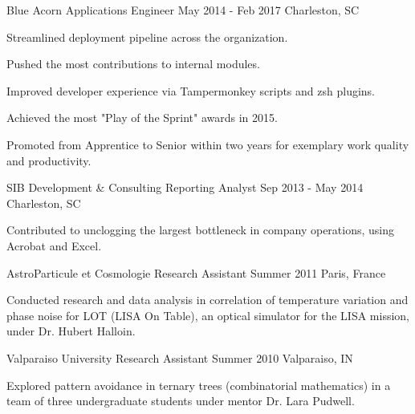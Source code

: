 

\begin{cventries}

  \cventry
    {Blue Acorn} %
    {Applications Engineer} %
    {May 2014 - Feb 2017} %
    {Charleston, SC} %
    {
      \begin{cvitems} %
        \item {Streamlined deployment pipeline across the organization.}
        \item {Pushed the most contributions to internal modules.}
        \item {Improved developer experience via Tampermonkey scripts and zsh plugins.}
        \item {Achieved the most "Play of the Sprint" awards in 2015.}
        \item {Promoted from Apprentice to Senior within two years for exemplary work quality and productivity.}
      \end{cvitems}
    }

  \cventry
    {SIB Development \& Consulting}
    {Reporting Analyst}
    {Sep 2013 - May 2014}
    {Charleston, SC}
    {
      \begin{cvitems}
        \item {Contributed to unclogging the largest bottleneck in company operations, using Acrobat and Excel.}
      \end{cvitems}
    }

  \cventry
    {AstroParticule et Cosmologie}
    {Research Assistant}
    {Summer 2011}
    {Paris, France}
    {
      \begin{cvitems}
        \item {Conducted research and data analysis in correlation of temperature variation and phase noise for LOT (LISA On Table), an optical simulator for the LISA mission, under Dr. Hubert Halloin.}
      \end{cvitems}
    }

  \cventry
    {Valparaiso University}
    {Research Assistant}
    {Summer 2010}
    {Valparaiso, IN}
    {
      \begin{cvitems}
        \item {Explored pattern avoidance in ternary trees (combinatorial mathematics) in a team of three undergraduate students under mentor Dr. Lara Pudwell.}
      \end{cvitems}
    }

\end{cventries}
